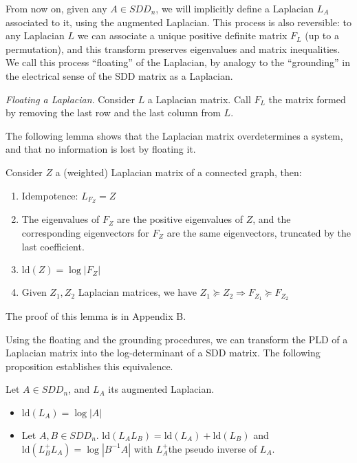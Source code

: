 From now on, given any $A\in SDD_{n}$, we will implicitly define
a Laplacian $L_{A}$ associated to it, using the augmented Laplacian.
This process is also reversible: to any Laplacian $L$ we can associate
a unique positive definite matrix $F_{L}$ (up to a permutation),
and this transform preserves eigenvalues and matrix inequalities.
We call this process ``floating'' of the Laplacian, by analogy to
the ``grounding'' in the electrical sense of the SDD matrix as a
Laplacian. 

\begin{definition}\emph{Floating a Laplacian}. Consider $L$ a Laplacian
matrix. Call $F_{L}$ the matrix formed by removing the last row and
the last column from $L$.

\end{definition}

The following lemma shows that the Laplacian matrix overdetermines
a system, and that no information is lost by floating it.

\begin{lemma}\label{lem:floating-properties}Consider $Z$ a (weighted)
Laplacian matrix of a connected graph, then:
\begin{enumerate}
\item Idempotence: $L_{F_{Z}}=Z$
\item The eigenvalues of $F_{Z}$ are the positive eigenvalues of $Z$,
and the corresponding eigenvectors for $F_{Z}$ are the same eigenvectors,
truncated by the last coefficient.
\item $\text{ld}\left(Z\right)=\log\left|F_{Z}\right|$
\item Given $Z_{1},Z_{2}$ Laplacian matrices, we have $Z_{1}\succeq Z_{2}\Rightarrow F_{Z_{1}}\succeq F_{Z_{2}}$
\end{enumerate}
\end{lemma}

The proof of this lemma is in Appendix B.

Using the floating and the grounding procedures, we can transform
the PLD of a Laplacian matrix into the log-determinant of a SDD matrix.
The following proposition establishes this equivalence.

\begin{lemma} \label{pro:pld-properties}Let $A\in SDD_{n}$, and
$L_{A}$ its augmented Laplacian.
\begin{itemize}
\item $\text{ld}\left(L_{A}\right)=\log\left|A\right|$ 
\item Let $A,B\in SDD_{n}$. $\text{ld}\left(L_{A}L_{B}\right)=\text{ld}\left(L_{A}\right)+\text{ld}\left(L_{B}\right)$
and $\text{ld}\left(L_{B}^{+}L_{A}\right)=\log\left|B^{-1}A\right|$
with $L_{A}^{+}$the pseudo inverse of $L_{A}$. 
\end{itemize}
\end{lemma}

